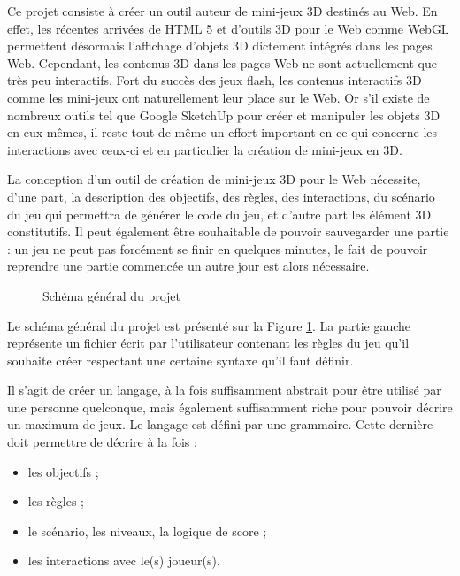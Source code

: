 Ce projet consiste à créer un outil auteur de mini-jeux 3D destinés au Web.
En effet, les récentes arrivées de HTML 5 et d'outils 3D pour le Web comme WebGL permettent désormais l'affichage d'objets 3D dictement
intégrés dans les pages Web.
Cependant, les contenus 3D dans les pages Web ne sont actuellement que très peu interactifs.
Fort du succès des jeux flash, les contenus interactifs 3D comme les mini-jeux ont naturellement leur place sur le Web.
Or s'il existe de nombreux outils tel que Google SketchUp pour créer et manipuler les objets 3D en eux-mêmes,
il reste tout de même un effort important en ce qui concerne les interactions avec ceux-ci et en particulier la création de mini-jeux en 3D.

\vspace{0.5cm}

La conception d'un outil de création de mini-jeux 3D pour le Web nécessite, d'une part, la description des objectifs, des règles, des interactions, 
du scénario du jeu qui permettra de générer le code du jeu, et d'autre part les élément 3D constitutifs.
Il peut également être souhaitable de pouvoir sauvegarder une partie :
un jeu ne peut pas forcément se finir en quelques minutes, le fait de pouvoir reprendre une partie commencée un autre jour est alors nécessaire.

\begin{figure}[h]
 \caption{Schéma général du projet}
 \label{fig:schemaprojet}
\end{figure}

Le schéma général du projet est présenté sur la Figure \ref{fig:schemaprojet}.
La partie gauche représente un fichier écrit par l'utilisateur contenant les règles du jeu qu'il souhaite créer respectant
une certaine syntaxe qu'il faut définir.

Il s'agit de créer un langage, à la fois suffisamment abstrait pour être utilisé par une personne quelconque, mais également suffisamment riche
pour pouvoir décrire un maximum de jeux.
Le langage est défini par une grammaire.
Cette dernière doit permettre de décrire à la fois :
\begin{itemize}
 \item les objectifs ;
 \item les règles ;
 \item le scénario, les niveaux, la logique de score ;
 \item les interactions avec le(s) joueur(s).
\end{itemize}


